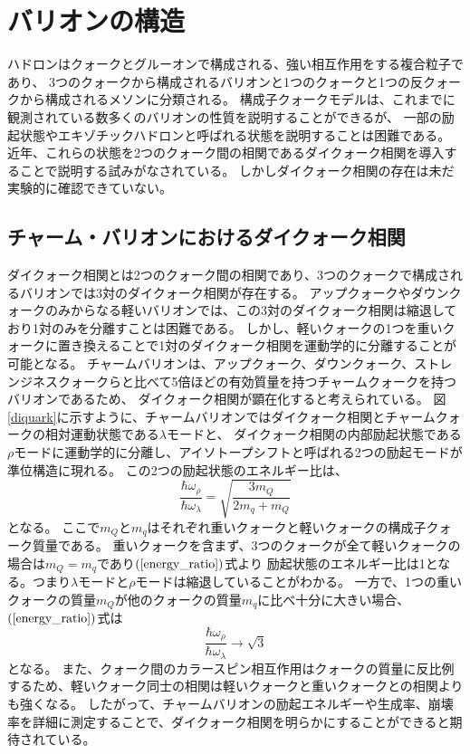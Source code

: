 \section{バリオンの構造}
ハドロンはクォークとグルーオンで構成される、強い相互作用をする複合粒子であり、
3つのクォークから構成されるバリオンと1つのクォークと1つの反クォークから構成されるメソンに分類される。
構成子クォークモデルは、これまでに観測されている数多くのバリオンの性質を説明することができるが、
一部の励起状態やエキゾチックハドロンと呼ばれる状態を説明することは困難である。
近年、これらの状態を2つのクォーク間の相関であるダイクォーク相関を導入することで説明する試みがなされている\cite{ref1}。
しかしダイクォーク相関の存在は未だ実験的に確認できていない。

\subsection{チャーム・バリオンにおけるダイクォーク相関}
ダイクォーク相関とは2つのクォーク間の相関であり、3つのクォークで構成されるバリオンでは3対のダイクォーク相関が存在する。
アップクォークやダウンクォークのみからなる軽いバリオンでは、この3対のダイクォーク相関は縮退しており1対のみを分離すことは困難である。
しかし、軽いクォークの1つを重いクォークに置き換えることで1対のダイクォーク相関を運動学的に分離することが可能となる。
チャームバリオンは、アップクォーク、ダウンクォーク、ストレンジネスクォークらと比べて5倍ほどの有効質量を持つチャームクォークを持つバリオンであるため、
ダイクォーク相関が顕在化すると考えられている。
図\ref{diquark}に示すように、チャームバリオンではダイクォーク相関とチャームクォークの相対運動状態である$\lambda$モードと、
ダイクォーク相関の内部励起状態である$\rho$モードに運動学的に分離し、アイソトープシフトと呼ばれる2つの励起モードが準位構造に現れる。
この2つの励起状態のエネルギー比は、
\begin{equation}
  \label{energy_ratio}
  \frac{\hbar\omega_{\rho}}{\hbar\omega_{\lambda}}=\sqrt{\frac{3m_{Q}}{2m_{q}+m_{Q}}}
\end{equation}
となる。
ここで$m_Q$と$m_q$はそれぞれ重いクォークと軽いクォークの構成子クォーク質量である。
重いクォークを含まず、3つのクォークが全て軽いクォークの場合は$m_Q=m_q$であり$(\ref{energy_ratio})$式より
励起状態のエネルギー比は1となる。つまり$\lambda$モードと$\rho$モードは縮退していることがわかる。
一方で、1つの重いクォークの質量$m_Q$が他のクォークの質量$m_q$に比べ十分に大きい場合、$(\ref{energy_ratio})$式は
\begin{equation}
  \label{energy_ratio2}
  \frac{\hbar\omega_{\rho}}{\hbar\omega_{\lambda}}\longrightarrow\sqrt{3}
\end{equation}
となる。
また、クォーク間のカラースピン相互作用はクォークの質量に反比例するため、軽いクォーク同士の相関は軽いクォークと重いクォークとの相関よりも強くなる。
したがって、チャームバリオンの励起エネルギーや生成率、崩壊率を詳細に測定することで、ダイクォーク相関を明らかにすることができると期待されている。